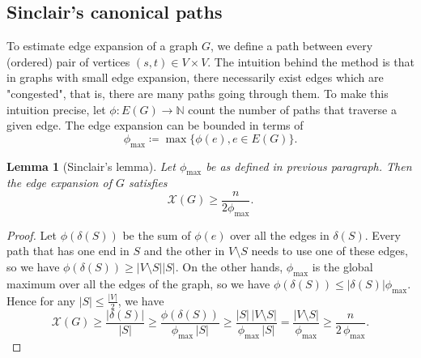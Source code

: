 \documentclass[a4paper,12pt]{book}
\theoremstyle{plain}
\newtheorem{lemma}[theorem]{Lemma}
\theoremstyle{definition}
\begin{document}
\subsection{Sinclair's canonical paths}

To estimate edge expansion of a graph $G$, we define a path between every (ordered) pair of vertices $(s,t) \in V \times V$.
The intuition behind the method is that in graphs with small edge expansion, there necessarily exist edges which are "congested", that is, there
are many paths going through them. To make this intuition precise, let $\phi: E(G) \rightarrow \mathbb{N}$ count the number of paths
that traverse a given edge. The edge expansion can be bounded 
in terms of
\begin{equation}
\phi_{\max} \coloneqq \max \{ \phi(e), e \in E(G) \}.
\end{equation}


\begin{lemma}[Sinclair's lemma]
\label{Sinclair}
Let $\phi_{\max}$ be as defined in previous paragraph. Then the edge expansion of $G$ satisfies 
\begin{equation}
\mathcal{X}(G) \ge \frac{n}{2 \phi_{\max}}.
\end{equation}
\end{lemma}

\begin{proof}
Let $\phi(\delta(S))$ be the sum of $\phi(e)$ over all the edges in $\delta(S)$. Every path that has one end in $S$
and the other in $V\setminus S$ needs to use one of these edges, so we have $\phi(\delta(S)) \ge   |V\setminus S | |S |$.
On the other hands, $\phi_{\max}$ is the global maximum over all the edges of the graph, so we have $\phi(\delta(S)) \le  |\delta(S) |\phi_{\max}$.
Hence for any $|S| \le \frac{ |V |}{2}$, we have
\begin{equation}
\label{sepbound}
 \mathcal{X}(G) \ge \frac{|\delta(S)|}{|S|} 
                \ge \frac{\phi(\delta(S))}{\phi_{\max}\,|S|}
                \ge \frac{|S|\,|V{\setminus}S|}{\phi_{\max}\,|S|}
                 =  \frac{|V{\setminus}S|}{\phi_{\max}}
				\ge \frac{n}{2\,\phi_{\max}}.
\end{equation}
\end{proof} 
\end{document}
